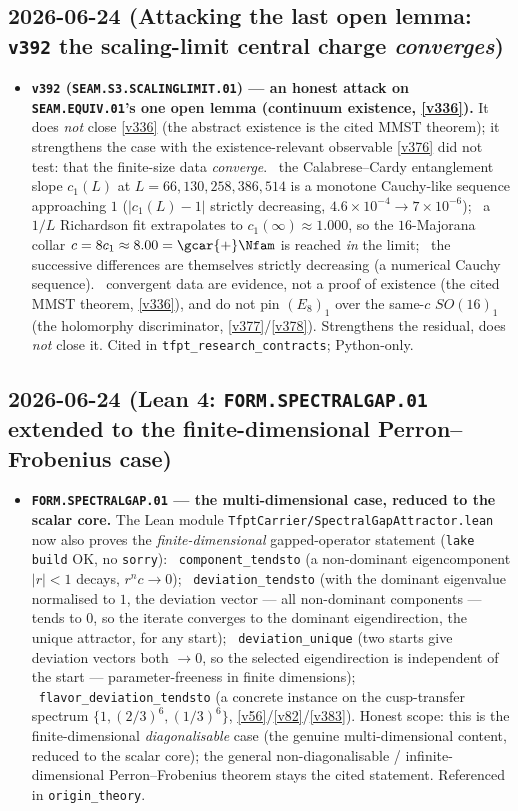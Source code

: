 \subsection*{2026-06-24 (Attacking the last open lemma: \texttt{v392} the scaling-limit central charge \emph{converges})}
\begin{itemize}
\item \textbf{\texttt{v392} (\texttt{SEAM.S3.SCALINGLIMIT.01}) --- an honest attack on \texttt{SEAM.EQUIV.01}'s one
open lemma (continuum existence, \vref{v336}).} It does \emph{not} close \vref{v336} (the abstract existence is the
cited MMST theorem); it strengthens the case with the existence-relevant observable \vref{v376} did not test: that
the finite-size data \emph{converge}. \mE\ the Calabrese--Cardy entanglement slope $c_1(L)$ at $L=66,130,258,386,514$
is a monotone Cauchy-like sequence approaching $1$ ($|c_1(L)-1|$ strictly decreasing, $4.6\times10^{-4}\to7\times10^{-6}$);
\mE\ a $1/L$ Richardson fit extrapolates to $c_1(\infty)\approx1.000$, so the $16$-Majorana collar $c=8c_1\approx8.00
=\gcar{+}\Nfam$ is reached \emph{in} the limit; \mE\ the successive differences are themselves strictly decreasing
(a numerical Cauchy sequence). \mO\ convergent data are evidence, not a proof of existence (the cited MMST theorem,
\vref{v336}), and do not pin $(E_8)_1$ over the same-$c$ $SO(16)_1$ (the holomorphy discriminator, \vref{v377}/\vref{v378}).
Strengthens the residual, does \emph{not} close it. Cited in \texttt{tfpt\_research\_contracts}; Python-only.
\end{itemize}

\subsection*{2026-06-24 (Lean 4: \texttt{FORM.SPECTRALGAP.01} extended to the finite-dimensional Perron--Frobenius case)}
\begin{itemize}
\item \textbf{\texttt{FORM.SPECTRALGAP.01} --- the multi-dimensional case, reduced to the scalar core.} The Lean
module \texttt{TfptCarrier/SpectralGapAttractor.lean} now also proves the \emph{finite-dimensional} gapped-operator
statement (\texttt{lake build} OK, no \texttt{sorry}): \mE\ \texttt{component\_tendsto} (a non-dominant eigencomponent
$|r|<1$ decays, $r^n c\to0$); \mE\ \texttt{deviation\_tendsto} (with the dominant eigenvalue normalised to $1$, the
deviation vector --- all non-dominant components --- tends to $0$, so the iterate converges to the dominant
eigendirection, the unique attractor, for any start); \mE\ \texttt{deviation\_unique} (two starts give deviation
vectors both $\to0$, so the selected eigendirection is independent of the start --- parameter-freeness in finite
dimensions); \mE\ \texttt{flavor\_deviation\_tendsto} (a concrete instance on the cusp-transfer spectrum
$\{1,(2/3)^6,(1/3)^6\}$, \vref{v56}/\vref{v82}/\vref{v383}). Honest scope: this is the finite-dimensional
\emph{diagonalisable} case (the genuine multi-dimensional content, reduced to the scalar core); the general
non-diagonalisable / infinite-dimensional Perron--Frobenius theorem stays the cited statement. Referenced in
\texttt{origin\_theory}.
\end{itemize}

